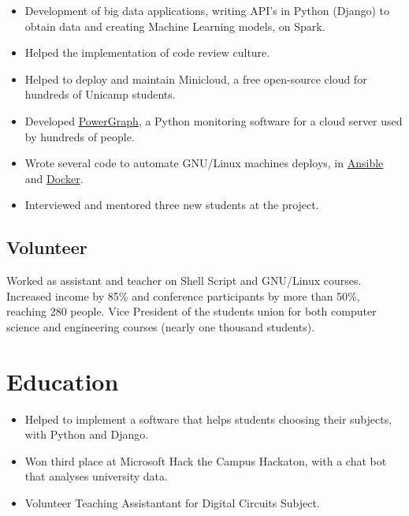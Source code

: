 \documentclass[10pt, a4paper, roman]{moderncv} %
\begin{document}
{
    \begin{itemize}
        \item Development of big data applications, writing API's in Python (Django) to obtain data and creating Machine Learning models, on Spark. 
        \item Helped the implementation of code review culture.
    \end{itemize}
}
{
    \begin{itemize}
        \item Helped to deploy and maintain Minicloud, a free open-source cloud for hundreds of Unicamp students.
        \item Developed \href{https://github.com/Guilhermeslucas/powergraph}{PowerGraph}, a Python monitoring software for a cloud server used by hundreds of people.
        \item Wrote several code to automate GNU/Linux machines deploys, in \href{https://github.com/Guilhermeslucas/Ansible-Code}{Ansible} and 
            \href{https://github.com/Guilhermeslucas/Dockerfiles}{Docker}.
        \item Interviewed and mentored three new students at the project.
    \end{itemize}
}
\subsection{Volunteer}
{
    Worked as assistant and teacher on Shell Script and GNU/Linux courses.
}
{
    Increased income by 85\% and conference participants by more than 50\%, reaching 280 people.
}
{
    Vice President of the students union for both computer science and engineering courses (nearly one thousand students).
}
\section{Education}

{
    \begin{itemize}
        \item Helped to implement a software that helps students choosing their subjects, with Python and Django.
        \item Won third place at Microsoft Hack the Campus Hackaton, with a chat bot that analyses university data.
        \item Volunteer Teaching Assistantant for Digital Circuits Subject.
    \end{itemize} 
}
\end{document}
